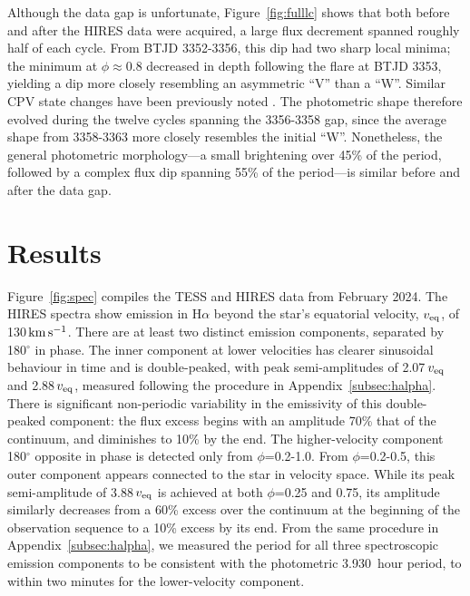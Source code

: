 \documentclass[11pt,twocolumn,tighten,linenumbers]{aastex7}
\newcommand{\kms}{\ensuremath{\rm km\,s^{-1}}}
\newcommand{\periodhr}{3.930}
\begin{document}
Although the data gap is unfortunate, Figure~\ref{fig:fulllc} shows that
both before and after the HIRES data were acquired, a large flux
decrement spanned roughly half of each cycle.  From BTJD 3352-3356, this
dip had two sharp local minima;  the minimum at $\phi$$\approx$0.8
decreased in depth following the flare at BTJD 3353, yielding a dip more
closely resembling an asymmetric ``V'' than a ``W''.  Similar CPV state
changes have been previously noted \citep{Stauffer2017,Bouma2024}.  The
photometric shape therefore evolved during the twelve cycles spanning
the 3356-3358 gap, since the average shape from 3358-3363 more closely
resembles the initial ``W''.  Nonetheless, the general photometric
morphology---a small brightening over 45\% of the period, followed by a
complex flux dip spanning 55\% of the period---is similar before and
after the data gap.


\section{Results}
\label{sec:results}



Figure~\ref{fig:spec} compiles the TESS and HIRES data from February
2024.  The HIRES spectra show emission in H$\alpha$ beyond the star's
equatorial velocity, $v_{\rm eq}$, of 130\,\kms.  There are at least
two distinct emission components, separated by 180$^\circ$ in phase.
The inner component at lower velocities has clearer sinusoidal
behaviour in time and is double-peaked, with peak semi-amplitudes of
2.07\,$v_{\rm eq}$ and 2.88\,$v_{\rm eq}$, measured following the
procedure in Appendix~\ref{subsec:halpha}.  There is significant
non-periodic variability in the emissivity of this double-peaked
component: the flux excess begins with an amplitude 70\% that of the
continuum, and diminishes to 10\% by the end.  The higher-velocity
component 180$^\circ$ opposite in phase is detected only from
$\phi$=0.2-1.0.  From $\phi$=0.2-0.5, this outer component appears
connected to the star in velocity space.  While its peak
semi-amplitude of 3.88\,$v_{\rm eq}$ is achieved at both $\phi$=0.25
and 0.75, its amplitude similarly decreases from a 60\% excess over
the continuum at the beginning of the observation sequence to a 10\%
excess by its end.  
From the same procedure in Appendix~\ref{subsec:halpha},
we measured
the period for all three spectroscopic
emission components to be consistent with the photometric \periodhr\ hour
period, to within two minutes for the lower-velocity component.  
\end{document}
